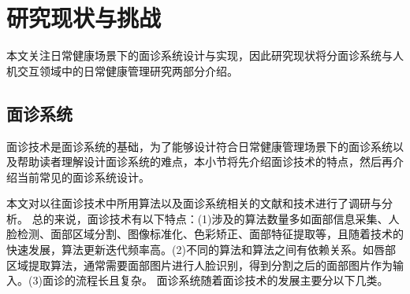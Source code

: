 \section{研究现状与挑战}
本文关注日常健康场景下的面诊系统设计与实现，因此研究现状将分面诊系统与人机交互领域中的日常健康管理研究两部分介绍。

\subsection{面诊系统}
\label{subsec:面诊系统}
面诊技术是面诊系统的基础，为了能够设计符合日常健康管理场景下的面诊系统以及帮助读者理解设计面诊系统的难点，本小节将先介绍面诊技术的特点，然后再介绍当前常见的面诊系统设计。

本文对以往面诊技术中所用算法以及面诊系统相关的文献和技术进行了调研与分析。
总的来说，面诊技术有以下特点：(1)涉及的算法数量多如面部信息采集、人脸检测、面部区域分割、图像标准化、色彩矫正、面部特征提取等\cite{宋海贝2018中医面诊信息自动识别方法研究进展}，且随着技术的快速发展，算法更新迭代频率高\cite{esteva2021deep}。(2)不同的算法和算法之间有依赖关系。如唇部区域提取算法，通常需要面部图片进行人脸识别，得到分割之后的面部图片作为输入\cite{Hu2016Robust}。(3)面诊的流程长且复杂\cite{林锋2019中医面诊系统调研报告}。
面诊系统随着面诊技术的发展主要分以下几类。

